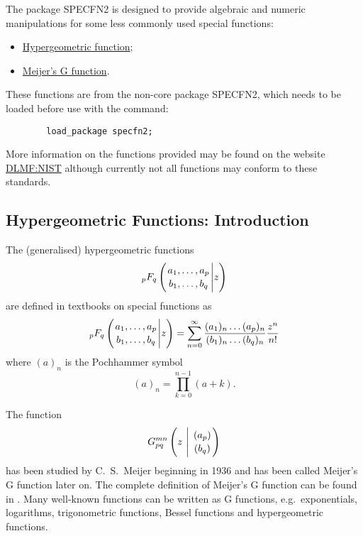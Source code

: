 \hypertarget{SPECFNS2}{}

The package SPECFN2 is designed to provide algebraic and numeric manipulations
for some less commonly used special functions:
\begin{itemize}
\item \hyperlink{HYPERGEOMETRIC}{Hypergeometric function};
\item \hyperlink{MEIJERG}{Meijer's G function}.
\end{itemize}

These functions are from the non-core package SPECFN2, which
needs to be loaded before use with the command:
\begin{verbatim}
        load_package specfn2;
\end{verbatim}

More information on the functions provided may be found on the website
\href{https://dlmf.nist.gov/}{DLMF:NIST} although currently not all functions
may conform to these standards.

\subsection{Hypergeometric Functions: Introduction}
The (generalised) hypergeometric functions
\begin{displaymath}
_pF_q \left( \genfrac{}{}{0pt}{}{a_1, \ldots , a_p}{b_1, \ldots ,b_q} \Bigg\vert z \right)
\end{displaymath}
are defined in textbooks on special functions as
\begin{displaymath}
_pF_q \left( \genfrac{}{}{0pt}{}{a_1, \ldots , a_p}{b_1, \ldots ,b_q} \Bigg\vert z \right)
  = \sum_{n=0}^{\infty}\frac{(a_{1})_{n}\dots(a_{p})_{n}}{(b_{1})_{n}\dots(b_{q})_{n}}\frac{z^{n}}{n!}
\end{displaymath}
where $(a)_{n}$ is the Pochhammer symbol
\begin{displaymath}
 (a)_{n} = \prod_{k=0}^{n-1} (a+k).
\end{displaymath}

The function 
\begin{displaymath}
G_{p q}^{m n} \left( z \  \Bigg\vert \  \genfrac{}{}{0pt}{}{(a_p)}{(b_q)} \right)
\end{displaymath}
has been studied by C.~S.~Meijer beginning in 1936 and has been
called Meijer's G function later on. The complete definition of Meijer's
G function can be found in \cite{Prudnikov:90c}.
Many well-known functions can be written as G functions,
e.g.\ exponentials, logarithms, trigonometric functions, Bessel functions
and hypergeometric functions.

